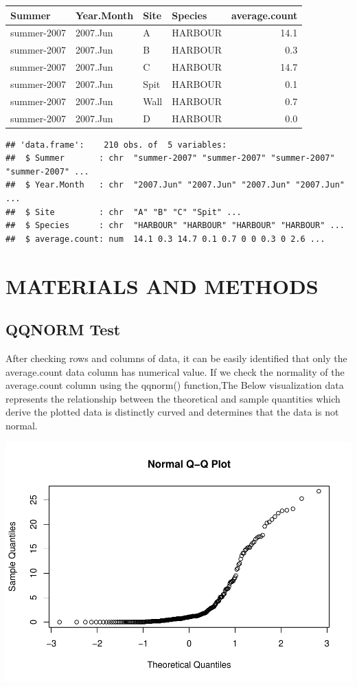 \documentclass[
]{article}
\begin{document}
\begin{longtable}[]{@{}llllr@{}}
\toprule
Summer & Year.Month & Site & Species & average.count\tabularnewline
\midrule
\endhead
summer-2007 & 2007.Jun & A & HARBOUR & 14.1\tabularnewline
summer-2007 & 2007.Jun & B & HARBOUR & 0.3\tabularnewline
summer-2007 & 2007.Jun & C & HARBOUR & 14.7\tabularnewline
summer-2007 & 2007.Jun & Spit & HARBOUR & 0.1\tabularnewline
summer-2007 & 2007.Jun & Wall & HARBOUR & 0.7\tabularnewline
summer-2007 & 2007.Jun & D & HARBOUR & 0.0\tabularnewline
\bottomrule
\end{longtable}

\begin{verbatim}
## 'data.frame':    210 obs. of  5 variables:
##  $ Summer       : chr  "summer-2007" "summer-2007" "summer-2007" "summer-2007" ...
##  $ Year.Month   : chr  "2007.Jun" "2007.Jun" "2007.Jun" "2007.Jun" ...
##  $ Site         : chr  "A" "B" "C" "Spit" ...
##  $ Species      : chr  "HARBOUR" "HARBOUR" "HARBOUR" "HARBOUR" ...
##  $ average.count: num  14.1 0.3 14.7 0.1 0.7 0 0 0.3 0 2.6 ...
\end{verbatim}

\hypertarget{materials-and-methods}{%
\section{MATERIALS AND METHODS}\label{materials-and-methods}}

\hypertarget{qqnorm-test}{%
\subsection{QQNORM Test}\label{qqnorm-test}}

After checking rows and columns of data, it can be easily identified
that only the average.count data column has numerical value. If we check
the normality of the average.count column using the qqnorm()
function,The Below visualization data represents the relationship
between the theoretical and sample quantities which derive the plotted
data is distinctly curved and determines that the data is not normal.

\includegraphics{Statistical-analysis-in-RStudio_files/figure-latex/unnamed-chunk-4-1.pdf}
\end{document}
